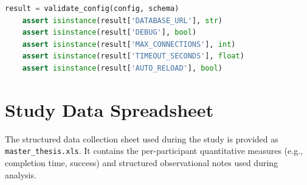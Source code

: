 \begin{appendices}
\begin{lstlisting}[language=Python]
    result = validate_config(config, schema)
    assert isinstance(result['DATABASE_URL'], str)
    assert isinstance(result['DEBUG'], bool)
    assert isinstance(result['MAX_CONNECTIONS'], int)
    assert isinstance(result['TIMEOUT_SECONDS'], float)
    assert isinstance(result['AUTO_RELOAD'], bool)
\end{lstlisting}
\chapter{Study Data Spreadsheet}
\label{app:master-thesis}

The structured data collection sheet used during the study is provided as \texttt{master\_thesis.xls}. It contains the per-participant quantitative measures (e.g., completion time, success) and structured observational notes used during analysis.

\cleardoublepage
\begin{landscape}

\end{landscape}



\end{appendices}
